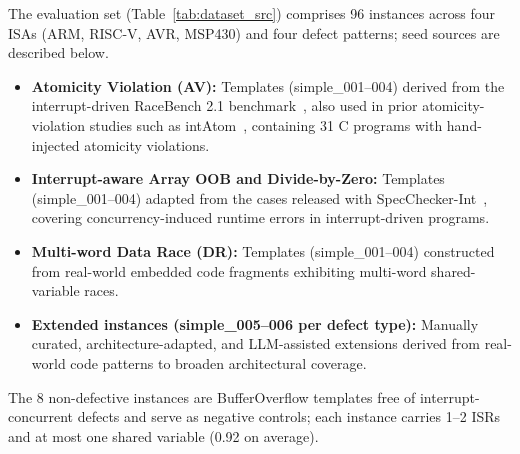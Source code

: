 \documentclass[conference]{IEEEtran}
\begin{document}
The evaluation set (Table~\ref{tab:dataset_src}) comprises 96 instances across four ISAs (ARM, RISC-V, AVR, MSP430) and four defect patterns; seed sources are described below.

\begin{itemize}
  \item \textbf{Atomicity Violation (AV):} Templates (simple\_001--004) derived from the interrupt-driven RaceBench 2.1 benchmark~\cite{racebench2021repo}, also used in prior atomicity-violation studies such as intAtom~\cite{li2022precise}, containing 31 C programs with hand-injected atomicity violations.
  \item \textbf{Interrupt-aware Array OOB and Divide-by-Zero:} Templates (simple\_001--004) adapted from the cases released with SpecChecker-Int~\cite{wang2025specchecker}, covering concurrency-induced runtime errors in interrupt-driven programs.
  \item \textbf{Multi-word Data Race (DR):} Templates (simple\_001--004) constructed from real-world embedded code fragments exhibiting multi-word shared-variable races.
  \item \textbf{Extended instances (simple\_005--006 per defect type):} Manually curated, architecture-adapted, and LLM-assisted extensions derived from real-world code patterns to broaden architectural coverage.
\end{itemize}

The 8 non-defective instances are BufferOverflow templates free of interrupt-concurrent defects and serve as negative controls; each instance carries 1--2 ISRs and at most one shared variable (0.92 on average).
\end{document}
